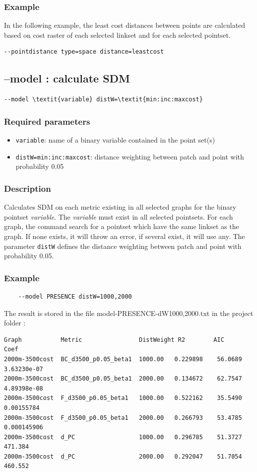\documentclass[a4paper,10pt]{report}
\begin{document}
\subsubsection{Example}
In the following example, the least cost distances between points are calculated based on cost raster of each selected linkset and for each selected pointset.
\begin{Verbatim}
--pointdistance type=space distance=leastcost
\end{Verbatim}


\subsection{--model : calculate SDM}
\begin{Verbatim}[commandchars=\\\{\}]
--model \textit{variable} distW=\textit{min:inc:maxcost}
\end{Verbatim}

\subsubsection{Required parameters}
\begin{itemize}
	\item \verb|variable|: name of a binary variable contained in the point set(s)
	\item \verb|distW=min:inc:maxcost|: distance weighting between patch and point with probability 0.05	
\end{itemize}

\subsubsection{Description}
Calculates SDM on each metric existing in all selected graphs for the binary pointset \textit{variable}.
The \textit{variable} must exist in all selected pointsets.
For each graph, the command search for a pointset which have the same linkset as the graph. If none exists, it will throw an error, if several exist, it will use any.
The parameter \verb|distW| defines the distance weighting between patch and point with probability 0.05.

\subsubsection{Example}
\begin{Verbatim}
	--model PRESENCE distW=1000,2000
\end{Verbatim}
The result is stored in the file model-PRESENCE-dW1000,2000.txt in the project folder :
\begin{Verbatim}[tabsize=3]
Graph           Metric                DistWeight R2        AIC       Coef
2000m-3500cost  BC_d3500_p0.05_beta1  1000.00	0.229898	56.0689	3.63230e-07
2000m-3500cost  BC_d3500_p0.05_beta1  2000.00	0.134672	62.7547	4.89398e-08
2000m-3500cost  F_d3500_p0.05_beta1   1000.00	0.522162	35.5490	0.00155784
2000m-3500cost  F_d3500_p0.05_beta1   2000.00	0.266793	53.4785	0.000145906
2000m-3500cost  d_PC                  1000.00	0.296785	51.3727	471.384
2000m-3500cost  d_PC                  2000.00	0.292047	51.7054	460.552
\end{Verbatim}
\end{document}
